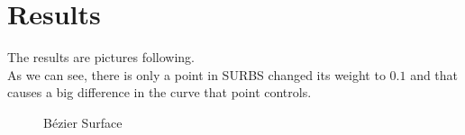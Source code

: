 \documentclass[acmtog]{acmart}
\begin{document}
\section{Results}
The results are pictures following.\\
As we can see, there is only a point in SURBS changed its weight to $0.1$ and that causes a big difference in the curve that point controls.\\
\begin{figure}[h]
	\centering
	\caption{Bézier Surface}
\end{figure}
\end{document}
